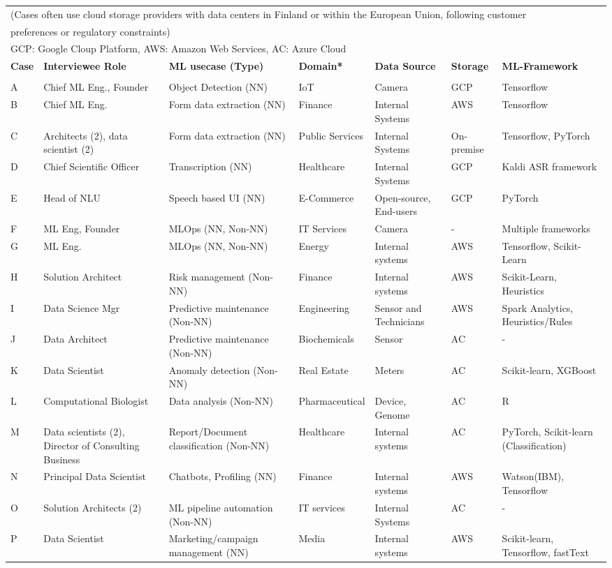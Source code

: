 \documentclass{IEEEcsmag}
\begin{document}
\begin{table*}[t]
\begin{tabular}{p{}p{}p{3cm}p{}p{2cm}p{}p{}}
    \multicolumn{7}{l}{
    (Cases often use cloud storage providers with data centers in Finland or within the European Union, following customer}\\
    \multicolumn{7}{l}{ preferences or regulatory constraints) }\\
    \multicolumn{7}{l}{GCP: Google Cloup Platform, AWS: Amazon Web Services, AC: Azure Cloud}\\
    \toprule
    \textbf{Case} & \textbf{Interviewee Role} & \textbf{ML usecase (Type)} & \textbf{Domain*} &\textbf{Data Source} & \textbf{Storage} & \textbf{ML-Framework} \\
    \toprule \\
    A & Chief ML Eng., Founder & Object Detection (NN) & IoT & Camera & GCP & Tensorflow \\
    B & Chief ML Eng. & Form data extraction  (NN) & Finance & Internal Systems & AWS & Tensorflow \\
    C & Architects (2), data scientist (2) & Form data extraction (NN) & Public Services & Internal Systems & On-premise & Tensorflow, PyTorch \\
    D & Chief Scientific Officer & Transcription (NN) & Healthcare & Internal Systems & GCP & Kaldi ASR framework \\
    E & Head of NLU & Speech based UI (NN) & E-Commerce & Open-source, End-users & GCP & PyTorch \\
   F & ML Eng, Founder & MLOps (NN, Non-NN) & IT Services & Camera  & - & Multiple frameworks \\
    G & ML Eng. & MLOps (NN, Non-NN)  & Energy & Internal systems & AWS & Tensorflow, Scikit-Learn \\
    H & Solution Architect & Risk management (Non-NN) & Finance & Internal systems & AWS & Scikit-Learn, Heuristics \\
    I & Data Science Mgr & Predictive maintenance (Non-NN) & Engineering & Sensor and Technicians & AWS &  Spark Analytics, Heuristics/Rules \\
    J & Data Architect & Predictive maintenance (Non-NN) & Biochemicals & Sensor & AC & - \\
    K & Data Scientist & Anomaly detection (Non-NN) & Real Estate & Meters & AC & Scikit-learn, XGBoost \\
    L & Computational Biologist & Data analysis (Non-NN) & Pharmaceutical & Device,  Genome & AC & R \\
    M & Data scientists (2), Director of Consulting Business  & Report/Document classification (Non-NN) & Healthcare & Internal systems & AC & PyTorch, Scikit-learn (Classification) \\
    N & Principal Data Scientist & Chatbots, Profiling (NN) & Finance & Internal systems & AWS & Watson(IBM), Tensorflow \\
    O & Solution Architects (2)& ML pipeline automation (Non-NN) & IT services & Internal Systems & AC & - \\
    P & Data Scientist & Marketing/campaign management (NN) & Media & Internal systems & AWS & Scikit-learn, Tensorflow, fastText \\
    \hline
    

\end{tabular}
\end{table*}
\end{document}
